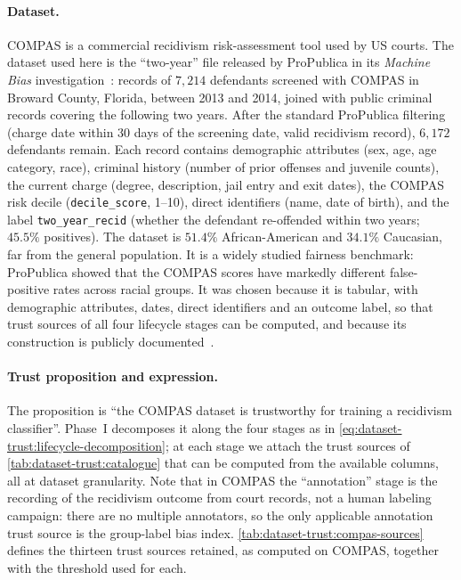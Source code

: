 \paragraph{Dataset.}
\ac{COMPAS} is a commercial recidivism risk-assessment tool used by US courts. The dataset used here is the ``two-year'' file released by ProPublica in its \emph{Machine Bias} investigation~\cite{angwin2016machine}: records of $7{,}214$ defendants screened with \ac{COMPAS} in Broward County, Florida, between 2013 and 2014, joined with public criminal records covering the following two years. After the standard ProPublica filtering (charge date within 30 days of the screening date, valid recidivism record), $6{,}172$ defendants remain. Each record contains demographic attributes (sex, age, age category, race), criminal history (number of prior offenses and juvenile counts), the current charge (degree, description, jail entry and exit dates), the \ac{COMPAS} risk decile (\texttt{decile\_score}, 1--10), direct identifiers (name, date of birth), and the label \texttt{two\_year\_recid} (whether the defendant re-offended within two years; $45.5\%$ positives). The dataset is $51.4\%$ African-American and $34.1\%$ Caucasian, far from the general population. It is a widely studied fairness benchmark: ProPublica showed that the \ac{COMPAS} scores have markedly different false-positive rates across racial groups. It was chosen because it is tabular, with demographic attributes, dates, direct identifiers and an outcome label, so that trust sources of all four lifecycle stages can be computed, and because its construction is publicly documented~\cite{angwin2016machine}.

\paragraph{Trust proposition and expression.}
The proposition is ``the \ac{COMPAS} dataset is trustworthy for training a recidivism classifier''. Phase~I decomposes it along the four stages as in \cref{eq:dataset-trust:lifecycle-decomposition}; at each stage we attach the trust sources of \cref{tab:dataset-trust:catalogue} that can be computed from the available columns, all at dataset granularity. Note that in \ac{COMPAS} the ``annotation'' stage is the recording of the recidivism outcome from court records, not a human labeling campaign: there are no multiple annotators, so the only applicable annotation trust source is the group-label bias index. \cref{tab:dataset-trust:compas-sources} defines the thirteen trust sources retained, as computed on \ac{COMPAS}, together with the threshold used for each.

